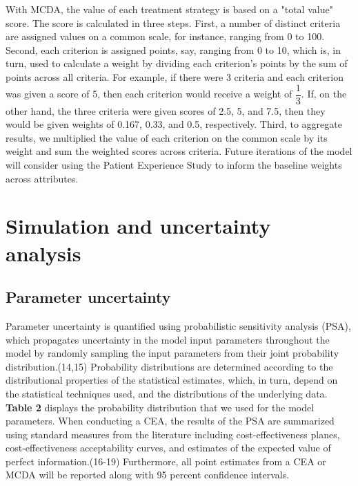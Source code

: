 \documentclass[11pt,final,fleqn]{article}\usepackage[]{graphicx}\usepackage[]{color}
\theoremstyle{plain}
\begin{document}
{With MCDA, the value of each treatment strategy is based on a "total value" score. The score is calculated in three steps. First, a number of distinct criteria are assigned values on a common scale, for instance, ranging from 0 to 100. Second, each criterion is assigned points, say, ranging from 0 to 10, which is, in turn, used to calculate a weight by dividing each criterion's points by the sum of points across all criteria. For example, if there were 3 criteria and each criterion was given a score of 5, then each criterion would receive a weight of $ \dfrac{1}{3} $. If, on the other hand, the three criteria were given scores of 2.5, 5, and 7.5, then they would be given weights of 0.167, 0.33, and 0.5, respectively. Third, to aggregate results, we multiplied the value of each criterion on the common scale by its weight and sum the weighted scores across criteria. Future iterations of the model will consider using the Patient Experience Study to inform the baseline weights across attributes. 


\section{Simulation and uncertainty analysis}\label{sec:uncertainty-analysis}

\subsection{Parameter uncertainty}

Parameter uncertainty is quantified using probabilistic sensitivity analysis (PSA), which propagates uncertainty in the model input parameters throughout the model by randomly sampling the input parameters from their joint probability distribution.(14,15) Probability distributions are determined according to the distributional properties of the statistical estimates, which, in turn, depend on the statistical techniques used, and the distributions of the underlying data. \textbf{Table 2} displays the probability distribution that we used for the model parameters. When conducting a CEA, the results of the PSA are summarized using standard measures from the literature including cost-effectiveness planes, cost-effectiveness acceptability curves, and estimates of the expected value of perfect information.(16-19) Furthermore, all point estimates from a CEA or MCDA will be reported along with 95 percent confidence intervals. 

}
\end{document}
